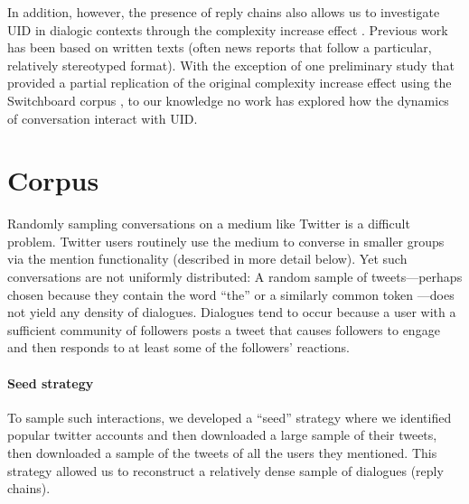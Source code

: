 \documentclass[11pt,letterpaper]{article}
\begin{document}
In addition, however, the presence of reply chains also allows us to investigate UID in dialogic contexts through the complexity increase effect \cite{genzel2002}. Previous work has been based on written texts (often news reports that follow a particular, relatively stereotyped format).  With the exception of one preliminary study that provided a partial replication of the original complexity increase effect using the Switchboard corpus \cite{vega2009}, to our knowledge no work has explored how the dynamics of conversation interact with UID. 





\section{Corpus}

Randomly sampling conversations on a medium like Twitter is a difficult problem. Twitter users routinely use the medium to converse in smaller groups via the \@ mention functionality (described in more detail below). Yet such conversations are not uniformly distributed: A random sample of tweets---perhaps chosen because they contain the word ``the'' or a similarly common token \cite{doyle2014}---does not yield any density of dialogues. Dialogues tend to occur because a user with a sufficient community of followers posts a tweet that causes followers to engage and then responds to at least some of the followers' reactions. 

\paragraph{Seed strategy}

To sample such interactions, we developed a ``seed'' strategy where we identified popular twitter accounts and then downloaded a large sample of their tweets, then downloaded a sample of the tweets of all the users they mentioned. This strategy allowed us to reconstruct a relatively dense sample of dialogues (reply chains).
\end{document}
